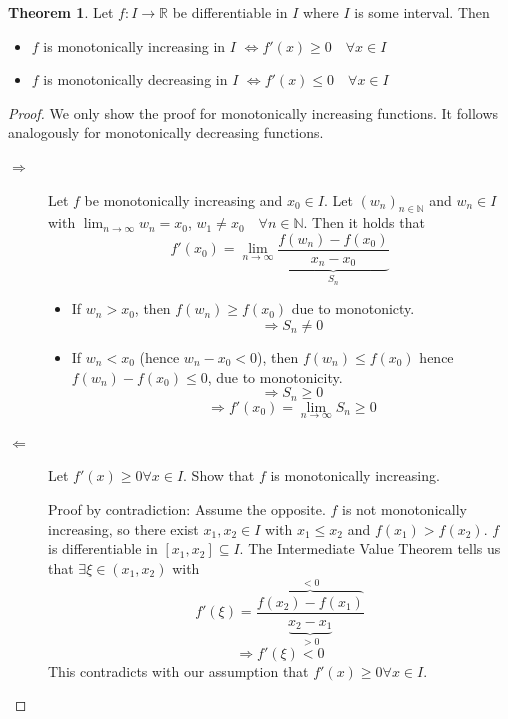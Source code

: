 \documentclass[a4paper,landscape,twocolumn]{article}
\theoremstyle{definition}
\newtheorem{theorem}{Theorem}
\begin{document}
%
\begin{theorem}
  Let $f: I \to \mathbb R$ be differentiable in $I$ where $I$ is some interval.
  Then
  \begin{itemize}
    \item $f$ is monotonically increasing in $I$ $\Leftrightarrow f'(x) \geq 0 \quad \forall x \in I$
    \item $f$ is monotonically decreasing in $I$ $\Leftrightarrow f'(x) \leq 0 \quad \forall x \in I$
  \end{itemize}
\end{theorem}
\begin{proof}
  We only show the proof for monotonically increasing functions.
  It follows analogously for monotonically decreasing functions.

  \begin{description}
    \item[$\Rightarrow$]
      Let $f$ be monotonically increasing and $x_0 \in I$. Let $(w_n)_{n\in\mathbb N}$
      and $w_n \in I$ with $\lim_{n\to\infty} w_n = x_0$, $w_1 \neq x_0 \quad \forall n \in \mathbb N$.
      Then it holds that
      \[ f'(x_0) = \lim_{n\to\infty} \underbrace{\frac{f(w_n) - f(x_0)}{x_n - x_0}}_{S_n} \]
      \begin{itemize}
        \item If $w_n > x_0$, then $f(w_n) \geq f(x_0)$ due to monotonicty.
          \[ \Rightarrow S_n \neq 0 \]
        \item If $w_n < x_0$ (hence $w_n - x_0 < 0$), then $f(w_n) \leq f(x_0)$ hence $f(w_n) - f(x_0) \leq 0$,
          due to monotonicity.
          \[ \Rightarrow S_n \geq 0 \]
          \[ \Rightarrow f'(x_0) = \lim_{n\to\infty} S_n \geq 0 \]
      \end{itemize}
    \item[$\Leftarrow$]
      Let $f'(x) \geq 0 \forall x \in I$. Show that $f$ is monotonically increasing.

      Proof by contradiction: Assume the opposite. $f$ is not monotonically increasing,
      so there exist $x_1, x_2 \in I$ with $x_1 \leq x_2$ and $f(x_1) > f(x_2)$.
      $f$ is differentiable in $[x_1, x_2] \subseteq I$. The Intermediate Value Theorem
      tells us that $\exists \xi \in (x_1, x_2)$ with
      \[ f'(\xi) = \frac{\overbrace{f(x_2) - f(x_1)}^{<0}}{\underbrace{x_2 - x_1}_{>0}} \]
      \[ \Rightarrow f'(\xi) < 0 \]
      This contradicts with our assumption that $f'(x) \geq 0 \forall x \in I$.
  \end{description}
\end{proof}
\end{document}
